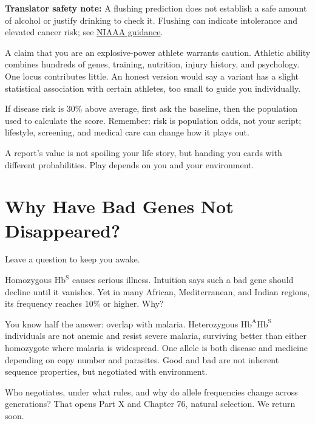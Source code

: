 \textbf{Translator safety note:} A flushing prediction does not establish a safe amount of alcohol or justify drinking to check it. Flushing can indicate intolerance and elevated cancer risk; see \href{https://www.niaaa.nih.gov/publications/alcohol-flush-reaction-does-drinking-alcohol-make-your-face-red}{NIAAA guidance}.

A claim that you are an explosive-power athlete warrants caution. Athletic ability combines hundreds of genes, training, nutrition, injury history, and psychology. One locus contributes little. An honest version would say a variant has a slight statistical association with certain athletes, too small to guide you individually.

If disease risk is $30\%$ above average, first ask the baseline, then the population used to calculate the score. Remember: risk is population odds, not your script; lifestyle, screening, and medical care can change how it plays out.

A report's value is not spoiling your life story, but handing you cards with different probabilities. Play depends on you and your environment.

\section{Why Have Bad Genes Not Disappeared?}

Leave a question to keep you awake.

Homozygous $\mathrm{Hb^{S}}$ causes serious illness. Intuition says such a bad gene should decline until it vanishes. Yet in many African, Mediterranean, and Indian regions, its frequency reaches $10\%$ or higher. Why?

You know half the answer: overlap with malaria. Heterozygous $\mathrm{Hb^{A}Hb^{S}}$ individuals are not anemic and resist severe malaria, surviving better than either homozygote where malaria is widespread. One allele is both disease and medicine depending on copy number and parasites. Good and bad are not inherent sequence properties, but negotiated with environment.

Who negotiates, under what rules, and why do allele frequencies change across generations? That opens Part X and Chapter 76, natural selection. We return soon.

